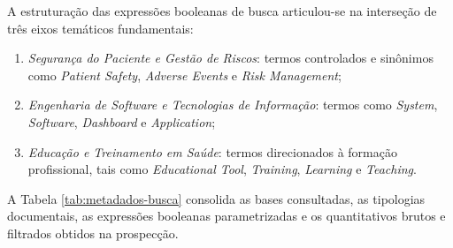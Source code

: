 A estruturação das expressões booleanas de busca articulou-se na interseção de três eixos temáticos fundamentais:
\begin{enumerate}
    \item \textit{Segurança do Paciente e Gestão de Riscos}: termos controlados e sinônimos como \textit{Patient Safety}, \textit{Adverse Events} e \textit{Risk Management};
    \item \textit{Engenharia de Software e Tecnologias de Informação}: termos como \textit{System}, \textit{Software}, \textit{Dashboard} e \textit{Application};
    \item \textit{Educação e Treinamento em Saúde}: termos direcionados à formação profissional, tais como \textit{Educational Tool}, \textit{Training}, \textit{Learning} e \textit{Teaching}.
\end{enumerate}

A Tabela \ref{tab:metadados-busca} consolida as bases consultadas, as tipologias documentais, as expressões booleanas parametrizadas e os quantitativos brutos e filtrados obtidos na prospecção.

